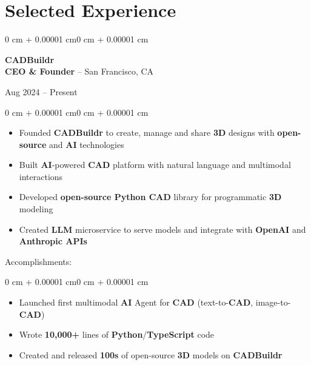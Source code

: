 \documentclass[10pt, letterpaper]{article}
\newenvironment{highlights}{
    \begin{itemize}[
        topsep=0.10 cm,
        parsep=0.10 cm,
        partopsep=0pt,
        itemsep=0pt,
        leftmargin=1.5 cm
    ]
}{
    \end{itemize}
}
\newenvironment{highlightsforbulletentries}{
    \begin{itemize}[
        topsep=0.10 cm,
        parsep=0.10 cm,
        partopsep=0pt,
        itemsep=0pt,
        leftmargin=1.5 cm
    ]
}{
    \end{itemize}
}
\newenvironment{onecolentry}{
    \begin{adjustwidth}{0 cm + 0.00001 cm}{0 cm + 0.00001 cm}
}{
    \end{adjustwidth}
}
\newenvironment{twocolentry}[2][]{
    \onecolentry
    \def\secondColumn{#2}
    \setcolumnwidth{\fill, 4.5 cm}
    \begin{paracol}{2}
}{
    \switchcolumn \raggedleft \secondColumn
    \end{paracol}
    \endonecolentry
}
\begin{document}
    \section{Selected Experience}
    \begin{twocolentry}{Aug 2024 -- Present}
        \textbf{CADBuildr} \\
        \textbf{CEO \& Founder} -- San Francisco, CA
    \end{twocolentry}
    \begin{onecolentry}
        \begin{highlights}
            \item Founded \textbf{CADBuildr} to create, manage and share \textbf{3D} designs with \textbf{open-source} and \textbf{AI} technologies
            \item Built \textbf{AI}-powered \textbf{CAD} platform with natural language and multimodal interactions
            \item Developed \textbf{open-source Python CAD} library for programmatic \textbf{3D} modeling
            \item Created \textbf{LLM} microservice to serve models and integrate with \textbf{OpenAI} and \textbf{Anthropic APIs}
        \end{highlights}
    \end{onecolentry}

    Accomplishments:
    \begin{onecolentry}
        \begin{highlightsforbulletentries}
            \item Launched first multimodal \textbf{AI} Agent for \textbf{CAD} (text-to-\textbf{CAD}, image-to-\textbf{CAD})
            \item Wrote \textbf{10,000+} lines of \textbf{Python}/\textbf{TypeScript} code
            \item Created and released \textbf{100s} of open-source \textbf{3D} models on \textbf{CADBuildr}
        \end{highlightsforbulletentries}
    \end{onecolentry}

    \vspace{0.5cm}
\end{document}
